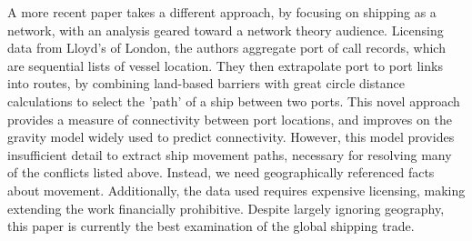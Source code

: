 \documentclass[12pt,letterpaper]{article}
\begin{document}

A more recent paper \citep{Kaluza2010} takes a different approach, by focusing on shipping as a network, with an analysis geared toward a network theory audience. Licensing data from Lloyd's of London, %
 the authors aggregate port of call records, which are sequential lists of vessel location. They then extrapolate port to port links into routes, by combining land-based barriers with great circle distance calculations to select the 'path' of a ship between two ports. This novel approach provides a measure of connectivity between port locations, and improves on the gravity model widely used to predict connectivity. %
However, this model provides insufficient detail to extract ship movement paths, necessary for resolving many of the conflicts listed above. Instead, we need geographically referenced facts about movement. Additionally, the data used requires expensive licensing, making extending the work financially prohibitive. Despite largely ignoring geography, this paper is currently the best examination of the global shipping trade.

\end{document}
